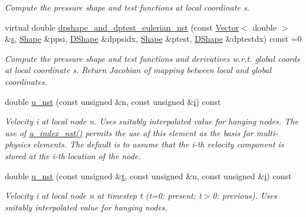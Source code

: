\begin{DoxyCompactItemize}
\begin{DoxyCompactList}\small\item\em Compute the pressure shape and test functions at local coordinate s. \end{DoxyCompactList}\item 
virtual double \hyperlink{classoomph_1_1NavierStokesEquations_a2f3024a4d370ec45ddffacb236bc2bb2}{dpshape\+\_\+and\+\_\+dptest\+\_\+eulerian\+\_\+nst} (const \hyperlink{classoomph_1_1Vector}{Vector}$<$ double $>$ \&\hyperlink{cfortran_8h_ab7123126e4885ef647dd9c6e3807a21c}{s}, \hyperlink{classoomph_1_1Shape}{Shape} \&ppsi, \hyperlink{classoomph_1_1DShape}{D\+Shape} \&dppsidx, \hyperlink{classoomph_1_1Shape}{Shape} \&ptest, \hyperlink{classoomph_1_1DShape}{D\+Shape} \&dptestdx) const =0
\begin{DoxyCompactList}\small\item\em Compute the pressure shape and test functions and derivatives w.\+r.\+t. global coords at local coordinate s. Return Jacobian of mapping between local and global coordinates. \end{DoxyCompactList}\item 
double \hyperlink{classoomph_1_1NavierStokesEquations_a67b980c0051620b1fe117d51c4cc6009}{u\+\_\+nst} (const unsigned \&n, const unsigned \&\hyperlink{cfortran_8h_adb50e893b86b3e55e751a42eab3cba82}{i}) const
\begin{DoxyCompactList}\small\item\em Velocity i at local node n. Uses suitably interpolated value for hanging nodes. The use of \hyperlink{classoomph_1_1NavierStokesEquations_a136756d3e5f4248b32ce44ecfcb5fb30}{u\+\_\+index\+\_\+nst()} permits the use of this element as the basis for multi-\/physics elements. The default is to assume that the i-\/th velocity component is stored at the i-\/th location of the node. \end{DoxyCompactList}\item 
double \hyperlink{classoomph_1_1NavierStokesEquations_ac7e340865e2838e2de5443699f0f7ae8}{u\+\_\+nst} (const unsigned \&\hyperlink{cfortran_8h_af6f0bd3dc13317f895c91323c25c2b8f}{t}, const unsigned \&n, const unsigned \&\hyperlink{cfortran_8h_adb50e893b86b3e55e751a42eab3cba82}{i}) const
\begin{DoxyCompactList}\small\item\em Velocity i at local node n at timestep t (t=0\+: present; t$>$0\+: previous). Uses suitably interpolated value for hanging nodes. \end{DoxyCompactList}\item 

\end{DoxyCompactItemize}
